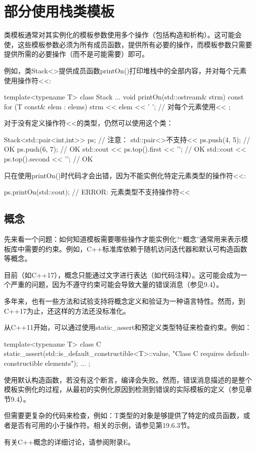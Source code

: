 \section{部分使用栈类模板}

类模板通常对其实例化的模板参数使用多个操作（包括构造和析构）。这可能会使，这些模板参数必须为所有成员函数，提供所有必要的操作，而模板参数只需要提供所需的必要操作（而不是可能需要）即可。

例如，类Stack<>提供成员函数printOn()打印堆栈中的全部内容，并对每个元素使用操作符<{}<:

\begin{cpp}
template<typename T>
class Stack {
	...
	void printOn(std::ostream& strm) const {
		for (T const& elem : elems) {
			strm << elem << ' '; // 对每个元素使用<<
		}
	}
};
\end{cpp}

对于没有定义操作符<{}<的类型，仍然可以使用这个类：

\begin{cpp}
Stack<std::pair<int,int>> ps; // 注意： std::pair<>不支持<<
ps.push({4, 5}); // OK
ps.push({6, 7}); // OK
std::cout << ps.top().first << '\n'; // OK
std::cout << ps.top().second << '\n'; // OK
\end{cpp}

只在使用printOn()时代码才会出错，因为不能实例化特定元素类型的操作符<{}<:

\begin{cpp}
ps.printOn(std::cout); // ERROR: 元素类型不支持操作符<<
\end{cpp}

\subsection{概念}

先来看一个问题：如何知道模板需要哪些操作才能实例化?“概念”通常用来表示模板库中需要的约束。例如，C++标准库依赖于随机访问迭代器和默认可构造函数等概念。

目前（如C++17），概念只能通过文字进行表达（如代码注释）。这可能会成为一个严重的问题，因为不遵守约束可能会导致大量的错误消息（参见9.4）。

多年来，也有一些方法和试验支持将概念定义和验证为一种语言特性。然而，到C++17为止，还这样的方法还没标准化。

从C++11开始，可以通过使用static\_assert和预定义类型特征来检查约束。例如：

\begin{cpp}
template<typename T>
class C {
	static_assert(std::is_default_constructible<T>::value,
	"Class C requires default-constructible elements");
	...
};
\end{cpp}

使用默认构造函数，若没有这个断言，编译会失败。然而，错误消息描述的是整个模板实例化的过程，从最初的实例化原因到检测到错误的实际模板的定义（参见章节9.4）。

但需要更复杂的代码来检查，例如：T类型的对象是够提供了特定的成员函数，或者是否有可用的小于操作符。相关的示例，请参见第19.6.3节。

有关C++概念的详细讨论，请参阅附录E。















